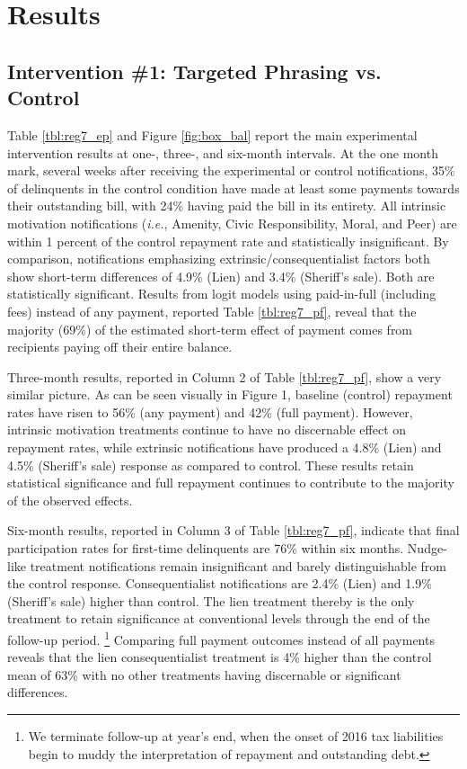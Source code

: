 \documentclass[12pt,titlepage]{article}
\begin{document}
\section{Results}

\subsection{Intervention \#1: Targeted Phrasing vs. Control}

Table \ref{tbl:reg7_ep} and Figure \ref{fig:box_bal} report the main experimental intervention results 
at one-, three-, and six-month intervals. At the one month mark, 
several weeks after receiving the experimental or control notifications, 
35\% of delinquents in the control condition have made at least some payments 
towards their outstanding bill, with 24\% having paid the bill in its entirety.
All intrinsic motivation notifications (\textit{i.e.}, Amenity, Civic Responsibility, 
Moral, and Peer) are within 1 percent of the control repayment rate and 
statistically insignificant. By comparison, notifications emphasizing 
extrinsic/consequentialist factors both show short-term differences of 
4.9\% (Lien) and 3.4\% (Sheriff's sale). Both are statistically significant. 
Results from logit models using paid-in-full (including fees) instead of any 
payment, reported Table \ref{tbl:reg7_pf}, reveal that the majority (69\%) of the estimated 
short-term effect of payment comes from recipients paying off their entire balance.

Three-month results, reported in Column 2 of Table \ref{tbl:reg7_pf}, show a very 
similar picture. As can be seen visually in Figure 1, baseline (control) 
repayment rates have risen to 56\% (any payment) and 42\% (full payment). 
However, intrinsic motivation treatments continue to have no discernable 
effect on repayment rates, while extrinsic notifications have produced a 
4.8\% (Lien) and 4.5\% (Sheriff's sale) response as compared to control. These 
results retain statistical significance and full repayment continues to 
contribute to the majority of the observed effects.

Six-month results, reported in Column 3 of Table \ref{tbl:reg7_pf}, indicate that final 
participation rates for first-time delinquents are 76\% within six months. 
Nudge-like treatment notifications remain insignificant and barely 
distinguishable from the control response. Consequentialist notifications 
are 2.4\% (Lien) and 1.9\% (Sheriff's sale) higher than control. The lien treatment 
thereby is the only treatment to retain significance at conventional 
levels through the end of the follow-up period.
\footnote{
	We terminate follow-up at year's end, when the onset of 2016 tax liabilities 
	begin to muddy the interpretation of repayment and outstanding debt.
}
Comparing full payment 
outcomes instead of all payments reveals that the lien consequentialist 
treatment is 4\% higher than the control mean of 63\% with no other 
treatments having discernable or significant differences.
\end{document}
